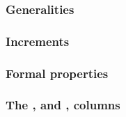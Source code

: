 \subsubsection{Generalities                                                              \lispTodo{}}    \label{hub: system: hub stamp: generalities}                 
\subsubsection{Increments                                                                \lispTodo{}}    \label{hub: system: hub stamp: increments}                   
\subsubsection{Formal properties                                                         \lispTodo{}}    \label{hub: system: hub stamp: formal properties}            
\subsubsection{The \tli, \tliCounter{} and \nonStackRows, \nonStackRowsCounter{} columns \lispTodo{}}    \label{hub: system: hub stamp: counters}                     

